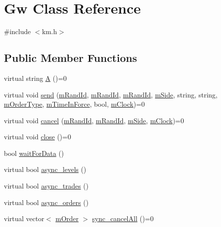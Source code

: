 \hypertarget{class_k_1_1_gw}{}\section{Gw Class Reference}
\label{class_k_1_1_gw}


{\ttfamily \#include $<$km.\+h$>$}

\subsection*{Public Member Functions}
\begin{DoxyCompactItemize}
\item 
virtual string \hyperlink{class_k_1_1_gw_aca39965d86b136eea65d98c8797af168}{A} ()=0
\item 
virtual void \hyperlink{class_k_1_1_gw_aaa3aac9b11f8b2d0fd549f88c049e7bb}{send} (\hyperlink{km_8h_a23233b27e494114073abc4d494b05626}{m\+Rand\+Id}, \hyperlink{km_8h_a23233b27e494114073abc4d494b05626}{m\+Rand\+Id}, \hyperlink{km_8h_a23233b27e494114073abc4d494b05626}{m\+Rand\+Id}, \hyperlink{namespace_k_a0b7d0fa0ffc9f87da1d6499cbcee7e94}{m\+Side}, string, string, \hyperlink{namespace_k_a131435180aff10fab1bf3da09af62b0d}{m\+Order\+Type}, \hyperlink{namespace_k_a290fccb3fc7d447fdbb93a61f6dfba44}{m\+Time\+In\+Force}, bool, \hyperlink{km_8h_ad02a70cba4c52ba2013e5e32ceaeac1c}{m\+Clock})=0
\item 
virtual void \hyperlink{class_k_1_1_gw_a20fa6fadc0acc192eec1f324742135ca}{cancel} (\hyperlink{km_8h_a23233b27e494114073abc4d494b05626}{m\+Rand\+Id}, \hyperlink{km_8h_a23233b27e494114073abc4d494b05626}{m\+Rand\+Id}, \hyperlink{namespace_k_a0b7d0fa0ffc9f87da1d6499cbcee7e94}{m\+Side}, \hyperlink{km_8h_ad02a70cba4c52ba2013e5e32ceaeac1c}{m\+Clock})=0
\item 
virtual void \hyperlink{class_k_1_1_gw_af6ee7eacbde6b379b68d954e44f6e549}{close} ()=0
\item 
bool \hyperlink{class_k_1_1_gw_ac4c94b7be7f6b0bfe7e42e31d965923c}{wait\+For\+Data} ()
\item 
virtual bool \hyperlink{class_k_1_1_gw_ad1293382b9b42a2fb3e1119078f97ca4}{async\+\_\+levels} ()
\item 
virtual bool \hyperlink{class_k_1_1_gw_aadf97204c27f5ef667c159182fac5e26}{async\+\_\+trades} ()
\item 
virtual bool \hyperlink{class_k_1_1_gw_aae17c049f2524a26e52ba61080b06fda}{async\+\_\+orders} ()
\item 
virtual vector$<$ \hyperlink{struct_k_1_1m_order}{m\+Order} $>$ \hyperlink{class_k_1_1_gw_aae707e552babec2a6f663f1c79745206}{sync\+\_\+cancel\+All} ()=0
\end{DoxyCompactItemize}
